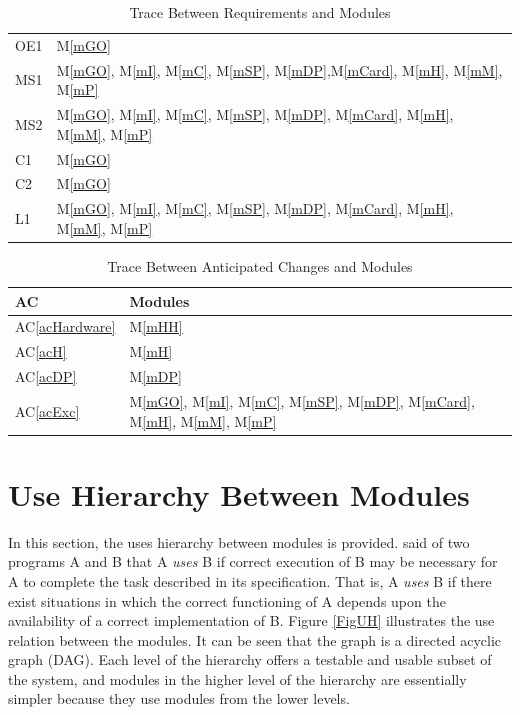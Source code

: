 \documentclass[12pt, titlepage]{article}
\newcommand{\acref}[1]{AC\ref{#1}}
\newcommand{\mref}[1]{M\ref{#1}}
\begin{document}
\begin{table}[H]
\begin{tabular}{p{} p{}}
        OE1 & \mref{mGO} \\
        MS1 & \mref{mGO}, \mref{mI}, \mref{mC}, \mref{mSP}, \mref{mDP},\mref{mCard}, \mref{mH}, \mref{mM}, \mref{mP} \\
        MS2 & \mref{mGO}, \mref{mI}, \mref{mC}, \mref{mSP}, \mref{mDP}, \mref{mCard}, \mref{mH}, \mref{mM}, \mref{mP} \\
        C1 & \mref{mGO} \\
        C2 & \mref{mGO} \\
        L1 & \mref{mGO}, \mref{mI}, \mref{mC}, \mref{mSP}, \mref{mDP}, \mref{mCard}, \mref{mH}, \mref{mM}, \mref{mP} \\
        \bottomrule
    \end{tabular}
    \caption{Trace Between Requirements and Modules}
    \label{TblRT}
\end{table}

\begin{table}[H]
\centering
\begin{tabular}{p{} p{}}
\toprule
\textbf{AC} & \textbf{Modules}\\
\midrule
\acref{acHardware} & \mref{mHH}\\
\acref{acH} & \mref{mH}\\
\acref{acDP} & \mref{mDP}\\
\acref{acExc} & \mref{mGO}, \mref{mI}, \mref{mC}, \mref{mSP}, \mref{mDP}, \mref{mCard}, \mref{mH}, \mref{mM}, \mref{mP}\\
\bottomrule
\end{tabular}
\caption{Trace Between Anticipated Changes and Modules}
\label{TblACT}
\end{table}

\section{Use Hierarchy Between Modules} \label{SecUse}

In this section, the uses hierarchy between modules is
provided. \citet{Parnas1978} said of two programs A and B that A {\em uses} B if
correct execution of B may be necessary for A to complete the task described in
its specification. That is, A {\em uses} B if there exist situations in which
the correct functioning of A depends upon the availability of a correct
implementation of B. Figure \ref{FigUH} illustrates the use relation between
the modules. It can be seen that the graph is a directed acyclic graph
(DAG). Each level of the hierarchy offers a testable and usable subset of the
system, and modules in the higher level of the hierarchy are essentially simpler
because they use modules from the lower levels.
\end{document}
